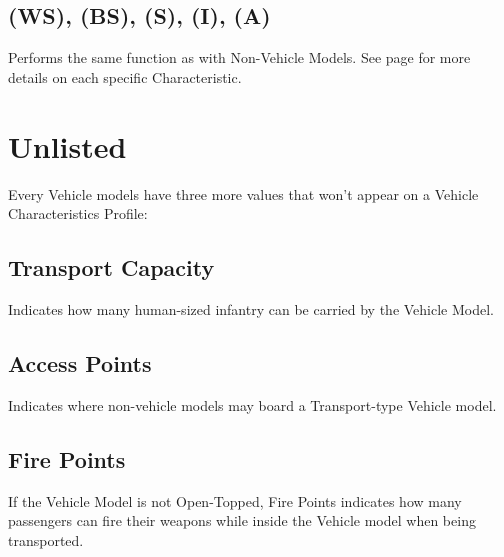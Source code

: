 \subsection{(WS), (BS), (S), (I), (A)}
Performs the same function as with Non-Vehicle Models. See page
\pageref{sec:characteristics} for more details on each specific Characteristic.

\section{Unlisted}
Every Vehicle models have three more values that won't appear on
a Vehicle Characteristics Profile:

\subsection{Transport Capacity}
Indicates how many human-sized infantry can be carried by the
Vehicle Model.

\subsection{Access Points}
Indicates where non-vehicle models may board a Transport-type
Vehicle model.

\subsection{Fire Points}
If the Vehicle Model is not Open-Topped, Fire Points indicates how
many passengers can fire their weapons while inside the Vehicle
model when being transported.

